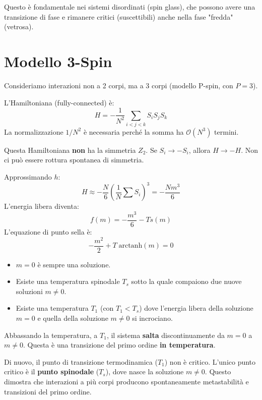 Questo è fondamentale nei sistemi disordinati (spin glass), che possono avere una transizione di fase e rimanere critici (suscettibili) anche nella fase "fredda" (vetrosa).

\newpage
\section{Modello 3-Spin}

Consideriamo interazioni non a 2 corpi, ma a 3 corpi (modello P-spin, con $P=3$).

L'Hamiltoniana (fully-connected) è:
\begin{equation}
    H = -\frac{1}{N^2} \sum_{i<j<k} S_i S_j S_k
\end{equation}
La normalizzazione $1/N^2$ è necessaria perché la somma ha $\mathcal{O}(N^3)$ termini.

\noindent Questa Hamiltoniana \textbf{non} ha la simmetria $Z_2$. Se $S_i \to -S_i$, allora $H \to -H$. Non ci può essere rottura spontanea di simmetria.

\noindent Approssimando $h$: 
\begin{equation}
H \approx -\frac{N}{6} (\frac{1}{N}\sum S_i)^3 = -\frac{N m^3}{6}
\end{equation}
L'energia libera diventa:
\begin{equation}
    f(m) = -\frac{m^3}{6} - T s(m)
\end{equation}
L'equazione di punto sella è:
\begin{equation}
    -\frac{m^2}{2} + T \; \text{arctanh}(m) = 0
\end{equation}

\begin{itemize}
    \item $m=0$ è sempre una soluzione.
    \item Esiste una temperatura spinodale $T_s$ sotto la quale compaiono due nuove soluzioni $m \neq 0$.
    \item Esiste una temperatura $T_1$ (con $T_1 < T_s$) dove l'energia libera della soluzione $m=0$ e quella della soluzione $m \neq 0$ si incrociano.
\end{itemize}
Abbassando la temperatura, a $T_1$, il sistema \textbf{salta} discontinuamente da $m=0$ a $m \neq 0$. Questa è una transizione del primo ordine \textbf{in temperatura}.

Di nuovo, il punto di transizione termodinamica ($T_1$) non è critico. L'unico punto critico è il \textbf{punto spinodale} ($T_s$), dove nasce la soluzione $m \neq 0$.
Questo dimostra che interazioni a più corpi producono spontaneamente metastabilità e transizioni del primo ordine.

